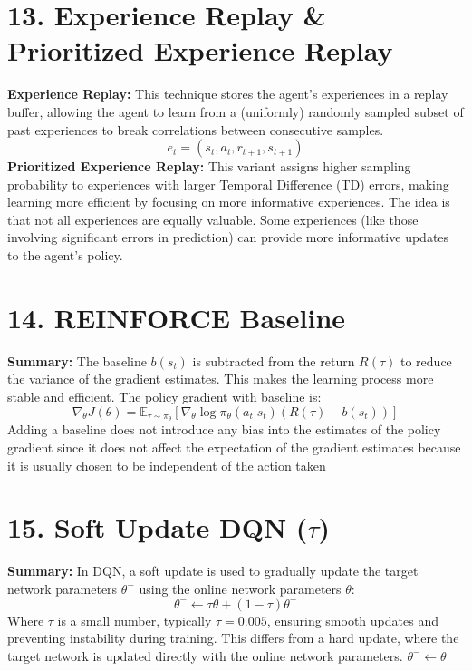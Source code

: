 \documentclass[a4paper,10pt]{article}
\begin{document}
\begin{multicols}{2}
\section*{13. Experience Replay \& Prioritized Experience Replay}
\textbf{Experience Replay:} This technique stores the agent's experiences in a replay buffer, allowing the agent to learn from a (uniformly) randomly sampled subset of past experiences to break correlations between consecutive samples.
\[
e_t = (s_t, a_t, r_{t+1}, s_{t+1})
\]
\textbf{Prioritized Experience Replay:} This variant assigns higher sampling probability to experiences with larger Temporal Difference (TD) errors, making learning more efficient by focusing on more informative experiences. The idea is that not all experiences are equally valuable. Some experiences (like those involving significant errors in prediction) can provide more informative updates to the agent's policy.

\section*{14. REINFORCE Baseline}
\textbf{Summary:} The baseline \( b(s_t) \) is subtracted from the return \( R(\tau) \) to reduce the variance of the gradient estimates. This makes the learning process more stable and efficient. The policy gradient with baseline is:
\[
\nabla_\theta J(\theta) = \mathbb{E}_{\tau \sim \pi_\theta} \left[ \nabla_\theta \log \pi_\theta(a_t | s_t) (R(\tau) - b(s_t)) \right]
\]
Adding a baseline does not introduce any bias into the estimates of the policy gradient since it does not affect the expectation of the gradient estimates because it is usually chosen to be independent of the action taken

\section*{15. Soft Update DQN (\(\tau\))}
\textbf{Summary:} In DQN, a soft update is used to gradually update the target network parameters \( \theta^- \) using the online network parameters \( \theta \):
\[
\theta^- \leftarrow \tau \theta + (1 - \tau) \theta^-
\]
Where \( \tau \) is a small number, typically \( \tau = 0.005 \), ensuring smooth updates and preventing instability during training. This differs from a hard update, where the target network is updated directly with the online network parameters. \( \theta^- \leftarrow \theta \)


\end{multicols}
\end{document}
